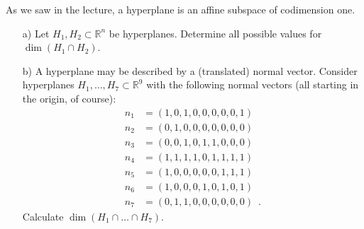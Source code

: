 As we saw in the lecture, a hyperplane is an affine subspace of codimension one. 
\begin{enumerate}

\item[a)]
 Let $H_1,H_2\subset\mathbb{R}^{n}$ be  hyperplanes. Determine all possible values for $\dim(H_1\cap H_2)$.

\item[b)] A hyperplane may be described by a (translated) normal vector. Consider hyperplanes $H_{1},\dots,H_{7}\subset\mathbb{R}^{9}$ with the following normal vectors (all starting in the origin, of course):
\begin{align*}
n_{1}&= (1, 0, 1, 0, 0, 0, 0, 0, 1)\\
n_{2}&= (0, 1, 0, 0, 0, 0, 0, 0, 0)\\
n_{3}&= (0, 0, 1, 0, 1, 1, 0, 0, 0)\\
n_{4}&= (1, 1, 1, 1, 0, 1, 1, 1, 1)\\
n_{5}&= (1, 0, 0, 0, 0, 0, 1, 1, 1)\\
n_{6}&= (1, 0, 0, 0, 1, 0, 1, 0, 1)\\
n_{7}&= (0, 1, 1, 0, 0, 0, 0, 0, 0) \enspace .
\end{align*}
Calculate $\dim(H_{1}\cap \dots\cap H_{7})$.
 
 
 


\end{enumerate}
